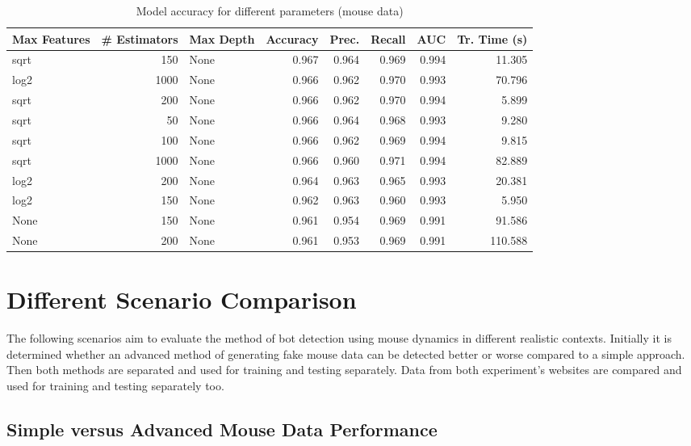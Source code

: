 \documentclass[
    fontsize=12pt,
    headings=small,
    parskip=half,           %
    bibliography=totoc,
    numbers=noenddot,       %
    open=any,               %
    final,                   %
    table
]{scrreprt}
\begin{document}
\begin{table}[H]
    \begin{center}
        \begin{tabular}{lrlrrrrr}
            \toprule Max Features & \# Estimators & Max Depth & Accuracy & Prec. & Recall & AUC & Tr. Time (s) \\
            \midrule
            sqrt & 150 & None & 0.967 & 0.964 & 0.969 & 0.994 & 11.305 \\
            log2 & 1000 & None & 0.966 & 0.962 & 0.970 & 0.993 & 70.796 \\
            \rowcolor{green!30}
            sqrt & 200 & None & 0.966 & 0.962 & 0.970 & 0.994 & 5.899 \\
            sqrt & 50 & None & 0.966 & 0.964 & 0.968 & 0.993 & 9.280 \\
            sqrt & 100 & None & 0.966 & 0.962 & 0.969 & 0.994 & 9.815 \\
            sqrt & 1000 & None & 0.966 & 0.960 & 0.971 & 0.994 & 82.889 \\
            log2 & 200 & None & 0.964 & 0.963 & 0.965 & 0.993 & 20.381 \\
            log2 & 150 & None & 0.962 & 0.963 & 0.960 & 0.993 & 5.950 \\
            None & 150 & None & 0.961 & 0.954 & 0.969 & 0.991 & 91.586 \\
            None & 200 & None & 0.961 & 0.953 & 0.969 & 0.991 & 110.588 \\
            \bottomrule
        \end{tabular}
    \end{center}
    \caption{Model accuracy for different parameters (mouse data)}
    \label{table:mouse_params}
\end{table}

\section{Different Scenario Comparison}

The following scenarios aim to evaluate the method of bot detection using mouse dynamics in different realistic contexts. Initially it is determined whether an advanced method of generating fake mouse data can be detected better or worse compared to a simple approach. Then both methods are separated and used for training and testing separately. Data from both experiment's websites are compared and used for training and testing separately too.

\subsection{Simple versus Advanced Mouse Data Performance}
\end{document}
